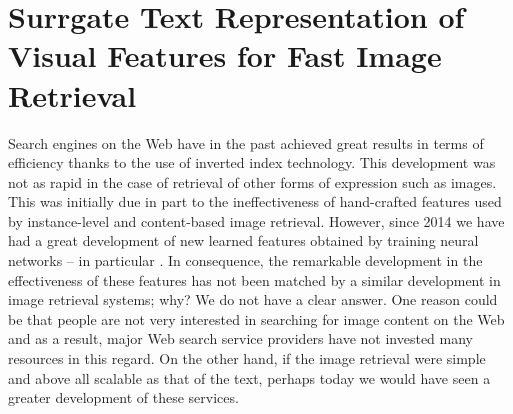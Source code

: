 
\renewcommand{\D}{\mathcal{X}} %
\renewcommand{\N}{{D}} %
\renewcommand{\bb}[1]{\boldsymbol {#1}} %
\renewcommand{\muu}{\bb{\mu}}

\graphicspath{{img/str/}}

\chapter{Surrgate Text Representation of Visual Features for Fast Image Retrieval}
\label{ch:str}


Search engines on the Web have in the past achieved great results in terms of efficiency thanks to the use of inverted index technology.
This development was not as rapid in the case of retrieval of other forms of expression such as images.
This was initially due in part to the ineffectiveness of hand-crafted features used by instance-level and content-based image retrieval.
However, since 2014 we have had a great development of new learned features obtained by training neural networks -- in particular .
In consequence, the remarkable development in the effectiveness of these features has not been matched by a similar development in image retrieval systems; why?
We do not have a clear answer.
One reason could be that people are not very interested in searching for image content on the Web and as a result, major Web search service providers have not invested many resources in this regard.
On the other hand, if the image retrieval were simple and above all scalable as that of the text, perhaps today we would have seen a greater development of these services.

